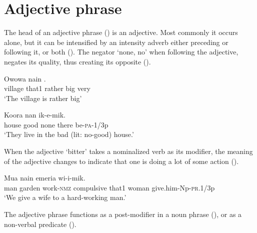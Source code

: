 \section{Adjective phrase}
{}
The head of an adjective phrase () is an adjective. Most commonly it occurs alone, but it can be intensified by an intensity adverb either preceding or following it, or both ().  The negator  `none, no' when following the adjective, negates its quality, thus creating its opposite ().  

\ea%
\label{ex:x841}
\gll Owowa  nain    . \\
    village  that1  rather  big  very  \\
\glt`The village is rather big'
\z





\ea%
\label{ex:x842}
\gll Koora     nan  ik-e-mik. \\
   house  good  none  there  be-\textsc{pa}-1/3p   \\
\glt`They live in the bad (lit: no-good) house.'
\z





When the adjective   `bitter' takes a nominalized verb as its modifier, the meaning of the adjective changes to indicate that one is doing a lot of some action ().

\ea%
\label{ex:x840}
\gll Mua       nain  emeria wi-i-mik. \\
   man  garden  work-\textsc{nmz}  compulsive  that1  woman  give.him-Np-\textsc{pr}.1/3p   \\
\glt`We give a wife to a hard-working man.'
\z









The adjective phrase functions as a post-modifier in a noun phrase (), or as a non-verbal predicate (). 

